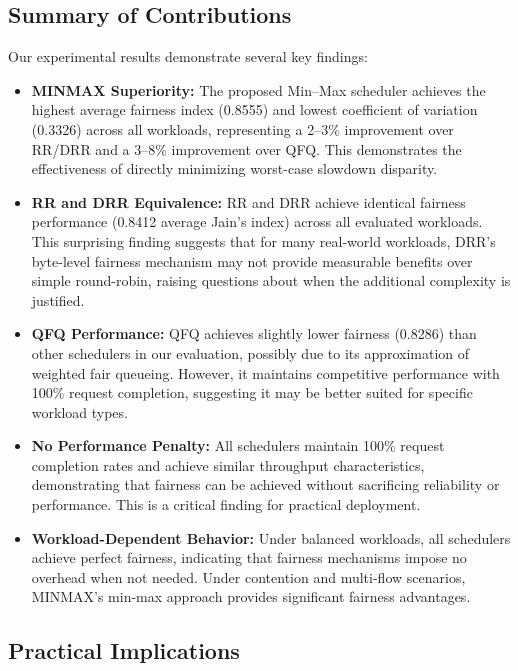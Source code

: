 \documentclass[11pt]{article}
\begin{document}
\subsection{Summary of Contributions}

Our experimental results demonstrate several key findings:

\begin{itemize}
    \item \textbf{MINMAX Superiority:} The proposed Min--Max scheduler achieves the highest average fairness index (0.8555) and lowest coefficient of variation (0.3326) across all workloads, representing a 2--3\% improvement over RR/DRR and a 3--8\% improvement over QFQ. This demonstrates the effectiveness of directly minimizing worst-case slowdown disparity.
    
    \item \textbf{RR and DRR Equivalence:} RR and DRR achieve identical fairness performance (0.8412 average Jain's index) across all evaluated workloads. This surprising finding suggests that for many real-world workloads, DRR's byte-level fairness mechanism may not provide measurable benefits over simple round-robin, raising questions about when the additional complexity is justified.
    
    \item \textbf{QFQ Performance:} QFQ achieves slightly lower fairness (0.8286) than other schedulers in our evaluation, possibly due to its approximation of weighted fair queueing. However, it maintains competitive performance with 100\% request completion, suggesting it may be better suited for specific workload types.
    
    \item \textbf{No Performance Penalty:} All schedulers maintain 100\% request completion rates and achieve similar throughput characteristics, demonstrating that fairness can be achieved without sacrificing reliability or performance. This is a critical finding for practical deployment.
    
    \item \textbf{Workload-Dependent Behavior:} Under balanced workloads, all schedulers achieve perfect fairness, indicating that fairness mechanisms impose no overhead when not needed. Under contention and multi-flow scenarios, MINMAX's min-max approach provides significant fairness advantages.
\end{itemize}

\subsection{Practical Implications}
\end{document}
